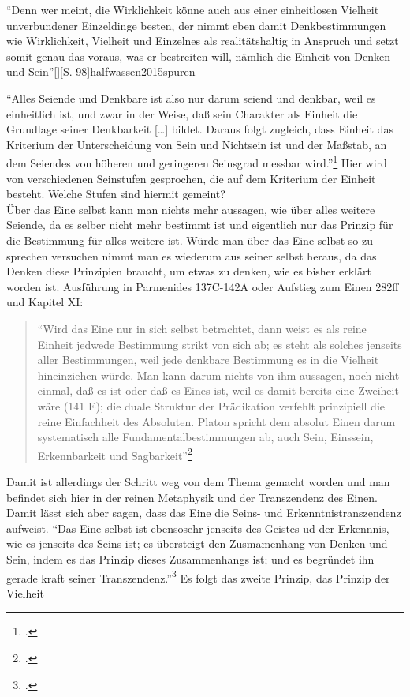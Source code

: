 \documentclass[12pt]{article}
\newcommand*{\zitatblock}[1]{%
    \begin{quote}
    \fontsize{10}{12}\selectfont
    \setlength{\parskip}{1.0em}
    #1
    \end{quote}
}
\begin{document}
\enquote{Denn wer meint, die Wirklichkeit könne auch aus einer einheitlosen Vielheit unverbundener Einzeldinge besten, der nimmt eben damit Denkbestimmungen wie Wirklichkeit, Vielheit und Einzelnes als realitätshaltig in Anspruch und setzt somit genau das voraus, was er bestreiten will, nämlich die Einheit von Denken und Sein}[][S. 98]{halfwassen2015spuren}

\enquote{Alles Seiende und Denkbare ist also nur darum seiend und denkbar, weil es einheitlich ist, und zwar in der Weise, daß sein Charakter als Einheit die Grundlage seiner Denkbarkeit [\dots] bildet. Daraus folgt zugleich, dass Einheit das Kriterium der Unterscheidung von Sein und Nichtsein ist und der Maßstab, an dem Seiendes von höheren und geringeren Seinsgrad messbar wird.}\footcite[vgl.][S. 99]{halfwassen2015spuren}
Hier wird von verschiedenen Seinstufen gesprochen, die auf dem Kriterium der Einheit besteht. Welche Stufen sind hiermit gemeint?\\
Über das Eine selbst kann man nichts mehr aussagen, wie über alles weitere Seiende, da es selber nicht mehr bestimmt ist und eigentlich nur das Prinzip für die Bestimmung für alles weitere ist. Würde man über das Eine selbst so zu sprechen versuchen nimmt man es wiederum aus seiner selbst heraus, da das Denken diese Prinzipien braucht, um etwas zu denken, wie es bisher erklärt worden ist. Ausführung in Parmenides 137C-142A oder Aufstieg zum Einen 282ff und Kapitel XI:
\zitatblock{\enquote{Wird das Eine nur in sich selbst betrachtet, dann weist es als reine Einheit jedwede Bestimmung strikt von sich ab; es steht als solches jenseits aller Bestimmungen, weil jede denkbare Bestimmung es in die Vielheit hineinziehen würde. Man kann darum nichts von ihm aussagen, noch nicht einmal, daß es ist oder daß es Eines ist, weil es damit bereits eine Zweiheit wäre (141 E); die duale Struktur der Prädikation verfehlt prinzipiell die reine Einfachheit des Absoluten. Platon spricht dem absolut Einen darum systematisch alle Fundamentalbestimmungen ab, auch Sein, Einssein, Erkennbarkeit und Sagbarkeit}\footcite[][S. 101]{halfwassen2015spuren}}
Damit ist allerdings der Schritt weg von dem Thema gemacht worden und man befindet sich hier in der reinen Metaphysik und der Transzendenz des Einen. 
Damit lässt sich aber sagen, dass das Eine die Seins- und Erkenntnistranszendenz aufweist. \enquote{Das Eine selbst ist ebensosehr jenseits des Geistes ud der Erkennnis, wie es jenseits des Seins ist; es übersteigt den Zusmamenhang von Denken und Sein, indem es das Prinzip dieses Zusammenhangs ist; und es begründet ihn gerade kraft seiner Transzendenz.}\footcite[][S. 102]{halfwassen2015spuren}
Es folgt das zweite Prinzip, das Prinzip der Vielheit
\end{document}
